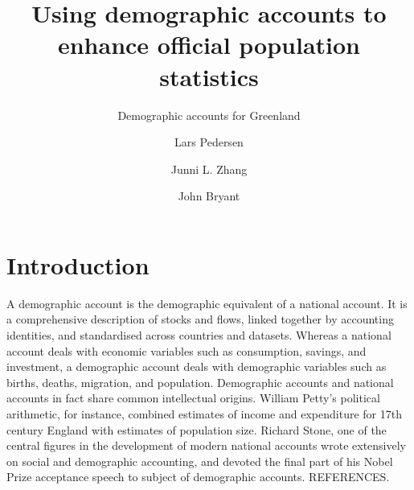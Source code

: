 \documentclass[USenglish]{article}
\begin{document}

  \author*[1]{Lars Pedersen}
  \author[2]{Junni L. Zhang}
  \author[3]{John Bryant} 
  \title{Using demographic accounts to enhance official population statistics}
  \subtitle{Demographic accounts for Greenland}
  \aop

\maketitle



\section{Introduction} 

A demographic account is the demographic equivalent of a national account. It is a comprehensive description of stocks and flows, linked together by accounting identities, and standardised across countries and datasets. Whereas a national account deals with economic variables such as consumption, savings, and investment, a demographic account deals with demographic variables such as births, deaths, migration, and population. Demographic accounts and national accounts in fact share common intellectual origins. William Petty's political arithmetic, for instance, combined estimates of income and expenditure for 17th century England with estimates of population size. Richard Stone, one of the central figures in the development of modern national accounts wrote extensively on social and demographic accounting, and devoted the final part of his Nobel Prize acceptance speech to subject of demographic accounts. REFERENCES.
\end{document}
